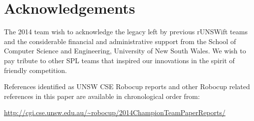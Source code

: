 \documentclass[runningheads,a4paper]{llncs}
\begin{document}
\section*{Acknowledgements}
The 2014 team wish to acknowledge the legacy left by previous rUNSWift teams and the considerable financial and administrative support from the School of Computer Science and Engineering, University of New South Wales. We wish to pay tribute to other SPL teams that inspired our innovations in the spirit of friendly competition. 





\newpage

\noindent References identified as UNSW CSE Robocup reports and other Robocup related references in this paper are available in chronological order from:

\noindent  \url{ http://cgi.cse.unsw.edu.au/~robocup/2014ChampionTeamPaperReports/ }



\end{document}
